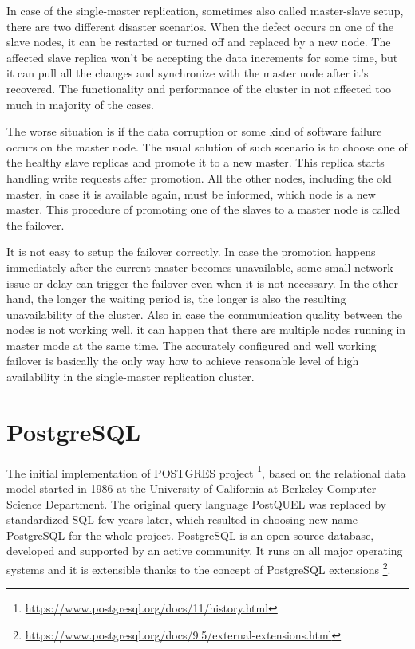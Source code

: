 \documentclass[
  digital, %
  twoside, %
  table,   %
  lof,     %
  lot,     %
]{fithesis3}
\begin{document}
In case of the single-master replication, sometimes also called master-slave setup, there are two different disaster scenarios. When the defect occurs on one of the slave nodes, it can be restarted or turned off and replaced by a new node. The affected slave replica won't be accepting the data increments for some time, but it can pull all the changes and synchronize with the master node after it's recovered. The functionality and performance of the cluster in not affected too much in majority of the cases.

The worse situation is if the data corruption or some kind of software failure occurs on the master node. The usual solution of such scenario is to choose one of the healthy slave replicas and promote it to a new master. This replica starts handling write requests after promotion. All the other nodes, including the old master, in case it is available again, must be informed, which node is a new master. This procedure of promoting one of the slaves to a master node is called the failover.

It is not easy to setup the failover correctly. In case the promotion happens immediately after the current master becomes unavailable, some small network issue or delay can trigger the failover even when it is not necessary. In the other hand, the longer the waiting period is, the longer is also the resulting unavailability of the cluster. Also in case the communication quality between the nodes is not working well, it can happen that there are multiple nodes running in master mode at the same time. The accurately configured and well working failover is basically the only way how to achieve reasonable level of high availability in the single-master replication cluster.

\section{PostgreSQL} \label{sec:postgresql}
The initial implementation of POSTGRES project \footnote{\url{https://www.postgresql.org/docs/11/history.html}}, based on the relational data model started in 1986 at the University of California at Berkeley Computer Science Department. The original query language PostQUEL was replaced by standardized SQL few years later, which resulted in choosing new name PostgreSQL for the whole project. PostgreSQL is an open source database, developed and supported by an active community. It runs on all major operating systems and it is extensible thanks to the concept of PostgreSQL extensions \footnote{\url{https://www.postgresql.org/docs/9.5/external-extensions.html}}.
\end{document}
